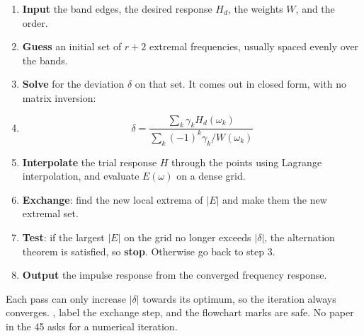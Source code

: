 \begin{enumerate}
  \item \textbf{Input} the band edges, the desired response $H_d$, the weights $W$, and
        the order.
  \item \textbf{Guess} an initial set of $r+2$ extremal frequencies, usually spaced
        evenly over the bands.
  \item \textbf{Solve} for the deviation $\delta$ on that set. It comes out in closed
        form, with no matrix inversion:
  \item[] \[ \delta=\frac{\sum_{k}\gamma_k H_d(\omega_k)}
                       {\sum_{k}(-1)^{k}\gamma_k/W(\omega_k)} \]
  \item \textbf{Interpolate} the trial response $H$ through the points using Lagrange
        interpolation, and evaluate $E(\omega)$ on a dense grid.
  \item \textbf{Exchange}: find the new local extrema of $|E|$ and make them the new
        extremal set.
  \item \textbf{Test}: if the largest $|E|$ on the grid no longer exceeds $|\delta|$,
        the alternation theorem is satisfied, so \textbf{stop}. Otherwise go back to
        step 3.
  \item \textbf{Output} the impulse response from the converged frequency response.
\end{enumerate}
{\color{sub}\footnotesize Each pass can only increase $|\delta|$ towards its optimum, so
the iteration always converges. ,
label the exchange step, and the flowchart marks are safe. No paper in the 45 asks for
a numerical iteration.}

\hr


